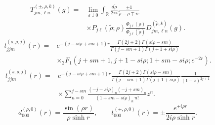 \documentclass{article}
\begin{document}
\begin{equation}
\boxed{\begin{aligned}
T^{(\pm,\rho,k)}_{jm,\ell n}(g)={}&\lim_{\varepsilon\downarrow0}\int_{\mathbb R}\frac{d\widetilde\rho}{2\pi i}\frac{\pm1}{\widetilde\rho-\rho\mp i\varepsilon}\\
&\times P_{j\ell}(\widetilde\rho;\rho)\frac{\Phi_{j\ell}(\rho)}{\Phi_{j\ell}(\widetilde\rho)}D^{(\widetilde\rho,k)}_{jm,\ell n}(g).
\end{aligned}}
\tag{Q6}
\end{equation}
\begin{equation}
\boxed{\begin{aligned}
t^{(s,\rho,j)}_{jjm}(r)={}&e^{-(j-si\rho+sm+1)r}\frac{\Gamma(2j+2)\Gamma(si\rho-sm)}{\Gamma(j-sm+1)\Gamma(j+1+si\rho)}\\
&\times{}_2F_1(j+sm+1,j+1-si\rho;1+sm-si\rho;e^{-2r}).
\end{aligned}}
\tag{Q7}
\end{equation}
\begin{equation}
\begin{aligned}
t^{(s,\rho,j)}_{jjm}(r)={}&e^{-(j-si\rho+sm+1)r}\frac{\Gamma(2j+2)\Gamma(si\rho-sm)}{\Gamma(j-sm+1)\Gamma(j+1+si\rho)}\frac1{(1-z)^{2j+1}}\\
&\times\sum_{n=0}^{j-sm}\frac{(-j-si\rho)_n(-j+sm)_n}{(1+sm-si\rho)_n\,n!}z^n.
\end{aligned}
\tag{Q8}
\end{equation}
\begin{equation}
d^{(\rho,0)}_{000}(r)=\frac{\sin(\rho r)}{\rho\sinh r},\qquad t^{(\pm,\rho,0)}_{000}(r)=\pm\frac{e^{\pm i\rho r}}{2i\rho\sinh r}.
\tag{Q9}
\end{equation}
\end{document}

